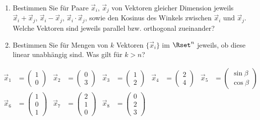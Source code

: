 \documentclass[11pt]{exam}
\begin{document}
\begin{questions}



\begin{enumerate}
	\item Bestimmen Sie für Paare $\vec{x}_i$, $\vec{x}_j$ von Vektoren gleicher Dimension jeweils $\vec{x}_i+\vec{x}_j$, $\vec{x}_i-\vec{x}_j$, $\vec{x}_i\cdot\vec{x}_j$, sowie den Kosinus des Winkels zwischen $\vec{x}_i$ und $\vec{x}_j$. Welche Vektoren sind jeweils parallel bzw. orthogonal zueinander?
	\item Bestimmen Sie für Mengen von $k$ Vektoren $\{\vec{x}_i\}$ im $\Rset^n$ jeweils, ob diese linear unabhängig sind. Was gilt für $k>n$?
\end{enumerate}
\begin{align*}
	\vec{x}_1&=\left(\begin{array}{c}1\\0\end{array}\right)
	&\vec{x}_2&=\left(\begin{array}{c}0\\3\end{array}\right)
	&\vec{x}_3&=\left(\begin{array}{c}1\\2\end{array}\right)
	&\vec{x}_4&=\left(\begin{array}{c}2\\4\end{array}\right)
	&\vec{x}_5&=\left(\begin{array}{c}\sin\beta\\\cos\beta\end{array}\right)\\
	\vec{x}_6&=\left(\begin{array}{c}1\\0\\1\end{array}\right)
	&\vec{x}_7&=\left(\begin{array}{c}2\\1\\0\end{array}\right)
	&\vec{x}_8&=\left(\begin{array}{c}0\\2\\3\end{array}\right)

\end{align*}
\end{questions}
\end{document}
